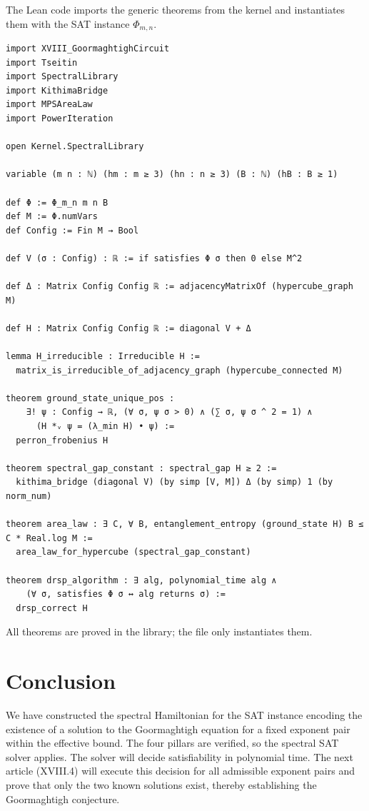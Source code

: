 \documentclass[11pt,a4paper]{article}
\begin{document}
The Lean code imports the generic theorems from the kernel and instantiates them with the SAT instance \(\Phi_{m,n}\).

\begin{lstlisting}[style=lean, caption={XVIII_GoormaghtighP3.lean (excerpt)}]
import XVIII_GoormaghtighCircuit
import Tseitin
import SpectralLibrary
import KithimaBridge
import MPSAreaLaw
import PowerIteration

open Kernel.SpectralLibrary

variable (m n : ℕ) (hm : m ≥ 3) (hn : n ≥ 3) (B : ℕ) (hB : B ≥ 1)

def Φ := Φ_m_n m n B
def M := Φ.numVars
def Config := Fin M → Bool

def V (σ : Config) : ℝ := if satisfies Φ σ then 0 else M^2

def Δ : Matrix Config Config ℝ := adjacencyMatrixOf (hypercube_graph M)

def H : Matrix Config Config ℝ := diagonal V + Δ

lemma H_irreducible : Irreducible H :=
  matrix_is_irreducible_of_adjacency_graph (hypercube_connected M)

theorem ground_state_unique_pos :
    ∃! ψ : Config → ℝ, (∀ σ, ψ σ > 0) ∧ (∑ σ, ψ σ ^ 2 = 1) ∧
      (H *ᵥ ψ = (λ_min H) • ψ) :=
  perron_frobenius H

theorem spectral_gap_constant : spectral_gap H ≥ 2 :=
  kithima_bridge (diagonal V) (by simp [V, M]) Δ (by simp) 1 (by norm_num)

theorem area_law : ∃ C, ∀ B, entanglement_entropy (ground_state H) B ≤ C * Real.log M :=
  area_law_for_hypercube (spectral_gap_constant)

theorem drsp_algorithm : ∃ alg, polynomial_time alg ∧
    (∀ σ, satisfies Φ σ ↔ alg returns σ) :=
  drsp_correct H
\end{lstlisting}

All theorems are proved in the library; the file only instantiates them.

\section{Conclusion}

We have constructed the spectral Hamiltonian for the SAT instance encoding the existence of a solution to the Goormaghtigh equation for a fixed exponent pair within the effective bound. The four pillars are verified, so the spectral SAT solver applies. The solver will decide satisfiability in polynomial time. The next article (XVIII.4) will execute this decision for all admissible exponent pairs and prove that only the two known solutions exist, thereby establishing the Goormaghtigh conjecture.
\end{document}
